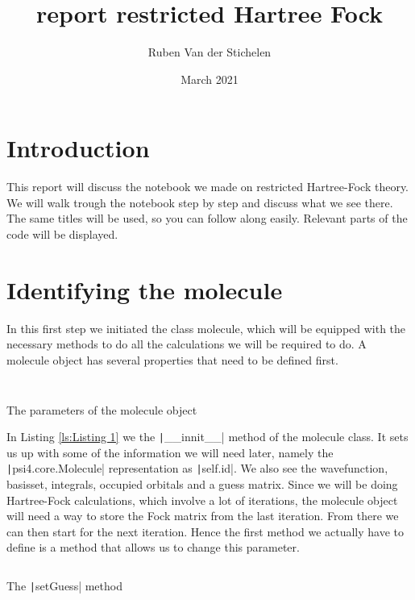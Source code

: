 \documentclass{article}
\title{report restricted Hartree Fock}
\author{Ruben Van der Stichelen }
\date{March 2021}
\begin{document}
\maketitle

\section{Introduction}
\label{sec:intro}
This report will discuss the notebook we made on restricted Hartree-Fock theory. We will walk trough the notebook step by step and discuss what we see there. The same titles will be used, so you can follow along easily. Relevant parts of the code will be displayed.

\section{Identifying the molecule}
\label{sec:step1}
In this first step we initiated the class molecule, which will be equipped with the necessary methods to do all the calculations we will be required to do. A molecule object has several properties that need to be defined first. 

\begin{listing}[ht]
    \centering
    \inputminted[firstline=12, lastline=12, gobble=4]{python}{Hartree_FockL.py}
    \inputminted[firstline=23, lastline=36, gobble=4]{python}{Hartree_FockL.py}
    \caption{The parameters of the molecule object}
    \label{ls:Listing 1}
\end{listing}
In Listing \ref{ls:Listing 1} we the \texttt|__innit__| method of the molecule class. It sets us up with some of the information we will need later, namely the \texttt|psi4.core.Molecule| representation as \texttt|self.id|. We also see the wavefunction, basisset, integrals, occupied orbitals and a guess matrix. Since we will be doing Hartree-Fock calculations, which involve a lot of iterations, the molecule object will need a way to store the Fock matrix from the last iteration. From there we can then start for the next iteration. Hence the first method we actually have to define is a method that allows us to change this parameter.

\begin{listing}[ht]
    \centering
    \inputminted[firstline=38, lastline=46, gobble=4]{python}{Hartree_FockL.py}
    \caption{The \texttt|setGuess| method}
    \label{ls: Listing 2}
\end{listing}
\end{document}
